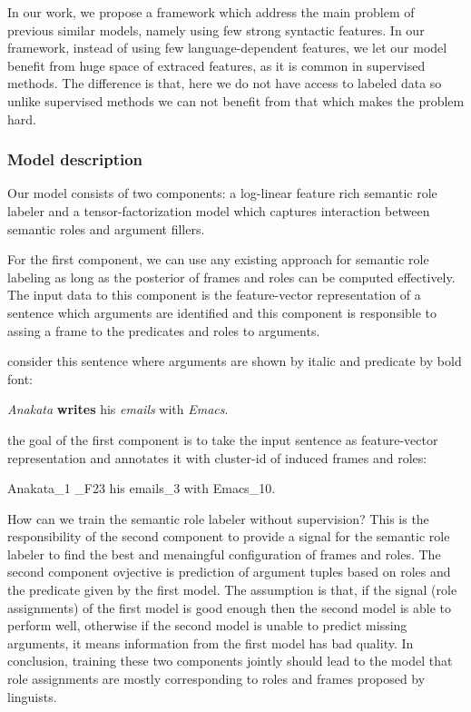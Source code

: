 In our work, we propose a framework which address the main problem of previous
similar models, namely using few strong syntactic features. In our framework,
instead of using few language-dependent features, we let our model
benefit from huge space of extraced features, as it is common in supervised
methods. The difference is that, here we do not have access to labeled data so
unlike supervised methods we can not benefit from that which makes the problem
hard. 


\subsubsection{Model description}
\label{sssec:model}
Our model consists of two components: a log-linear feature rich semantic role labeler and
a tensor-factorization model which captures interaction between semantic roles and argument fillers. 

For the first component, we can use any existing approach for semantic role
labeling as long as the posterior of frames and roles can be computed
effectively. The input data to this component is the feature-vector
representation of a sentence which arguments are identified and this component
is responsible to assing a frame to the predicates and roles to arguments.
 
consider this sentence where arguments are shown by italic and predicate by
bold font:

\begin{center}
 \textit{Anakata} \textbf{writes} his \textit{emails} with  \textit{Emacs}.
\end{center}

the goal of the first component is to take the input sentence as feature-vector
representation and annotates it with cluster-id of induced frames and roles:

\begin{center}
\lbrack Anakata\rbrack_{1}  
    \rbrack_{F23} his \lbrack
    emails\rbrack_{3} with \lbrack
    Emacs\rbrack_{10}.
\end{center}

How can we train the semantic role labeler without supervision? This is the
responsibility of the second component to provide a signal for the semantic role
labeler to find the best and menaingful configuration of frames and
roles. The second component ovjective is prediction of argument tuples based
on roles and the predicate given by the first model. The assumption is that, if
the signal (role assignments) of the first model is good enough then the second
model is able to perform well, otherwise if the second model is unable to
predict missing arguments, it means information from the first model has bad
quality. In conclusion, training these two components jointly should lead to the
model that role assignments are mostly corresponding to roles and frames
proposed by linguists. 

